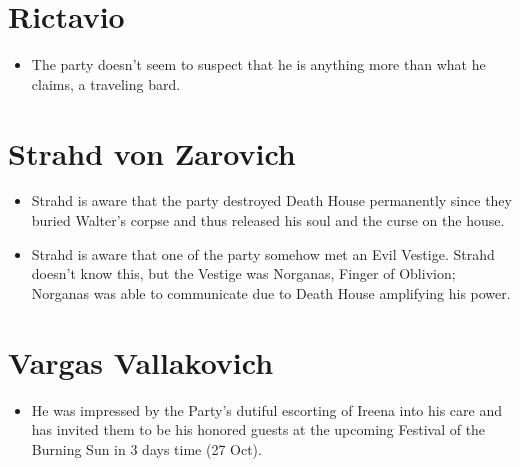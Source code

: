 \documentclass[a4paper,11pt]{article}
\begin{document}
\section{Rictavio}
\begin{itemize}
  \item The party doesn't seem to suspect that he is anything more than what he claims, a traveling bard.
\end{itemize}

\section{Strahd von Zarovich}
\begin{itemize}
  \item Strahd is aware that the party destroyed Death House permanently since they buried Walter's corpse and 
  thus released his soul and the curse on the house.
  \item Strahd is aware that one of the party somehow met an Evil Vestige. Strahd doesn't know this, but the 
  Vestige was Norganas, Finger of Oblivion; Norganas was able to communicate due to Death House amplifying his 
  power.
\end{itemize}

\section{Vargas Vallakovich}
\begin{itemize}
  \item He was impressed by the Party's dutiful escorting of Ireena into his care and has invited them to be his
  honored guests at the upcoming Festival of the Burning Sun in 3 days time (27 Oct).
\end{itemize}
\end{document}
